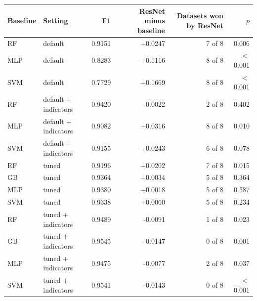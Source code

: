 \begin{tabular}{llrrrr}
\toprule
Baseline & Setting & F1 & ResNet minus baseline & Datasets won by ResNet & $p$ \\
\midrule
RF & default & 0.9151 & +0.0247 & 7 of 8 & 0.006 \\
MLP & default & 0.8283 & +0.1116 & 8 of 8 & $<$0.001 \\
SVM & default & 0.7729 & +0.1669 & 8 of 8 & $<$0.001 \\
\midrule
RF & default + indicators & 0.9420 & -0.0022 & 2 of 8 & 0.402 \\
MLP & default + indicators & 0.9082 & +0.0316 & 8 of 8 & 0.010 \\
SVM & default + indicators & 0.9155 & +0.0243 & 6 of 8 & 0.078 \\
\midrule
RF & tuned & 0.9196 & +0.0202 & 7 of 8 & 0.015 \\
GB & tuned & 0.9364 & +0.0034 & 5 of 8 & 0.364 \\
MLP & tuned & 0.9380 & +0.0018 & 5 of 8 & 0.587 \\
SVM & tuned & 0.9338 & +0.0060 & 5 of 8 & 0.234 \\
\midrule
RF & tuned + indicators & 0.9489 & -0.0091 & 1 of 8 & 0.023 \\
GB & tuned + indicators & 0.9545 & -0.0147 & 0 of 8 & 0.001 \\
MLP & tuned + indicators & 0.9475 & -0.0077 & 2 of 8 & 0.037 \\
SVM & tuned + indicators & 0.9541 & -0.0143 & 0 of 8 & $<$0.001 \\
\bottomrule
\end{tabular}

